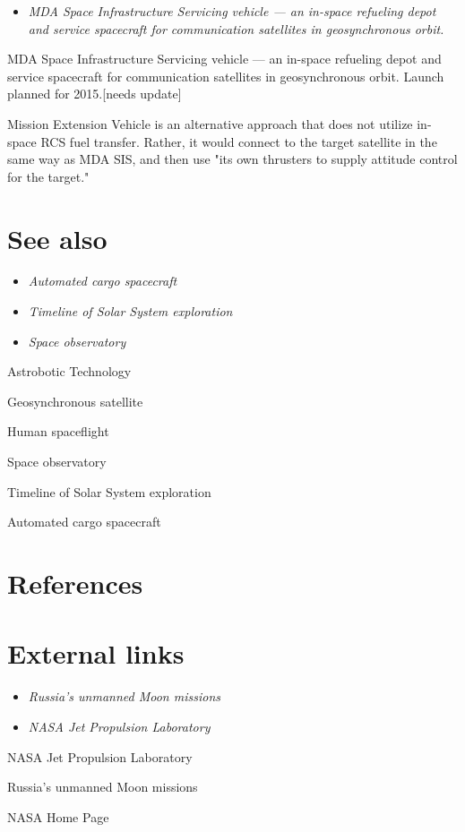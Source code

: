 \begin{itemize}
\item
  \emph{MDA Space Infrastructure Servicing vehicle --- an in-space
  refueling depot and service spacecraft for communication satellites in
  geosynchronous orbit.}
\end{itemize}

MDA Space Infrastructure Servicing vehicle --- an in-space refueling
depot and service spacecraft for communication satellites in
geosynchronous orbit. Launch planned for 2015.{[}needs update{]}

Mission Extension Vehicle is an alternative approach that does not
utilize in-space RCS fuel transfer. Rather, it would connect to the
target satellite in the same way as MDA SIS, and then use "its own
thrusters to supply attitude control for the target."

\section{See also}\label{see-also}

\begin{itemize}
\item
  \emph{Automated cargo spacecraft}
\item
  \emph{Timeline of Solar System exploration}
\item
  \emph{Space observatory}
\end{itemize}

Astrobotic Technology

Geosynchronous satellite

Human spaceflight

Space observatory

Timeline of Solar System exploration

Automated cargo spacecraft

\section{References}\label{references}

\section{External links}\label{external-links}

\begin{itemize}
\item
  \emph{Russia's unmanned Moon missions}
\item
  \emph{NASA Jet Propulsion Laboratory}
\end{itemize}

NASA Jet Propulsion Laboratory

Russia's unmanned Moon missions

NASA Home Page
